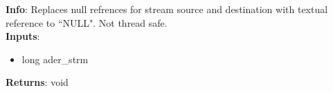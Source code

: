 \textbf{Info}: Replaces null refrences for stream source and destination with
textual reference to ``NULL". Not thread safe. \\

\noindent \textbf{Inputs}:
\begin{itemize}
\item{long ader\_strm}
\end{itemize}

\noindent \textbf{Returns}: void
